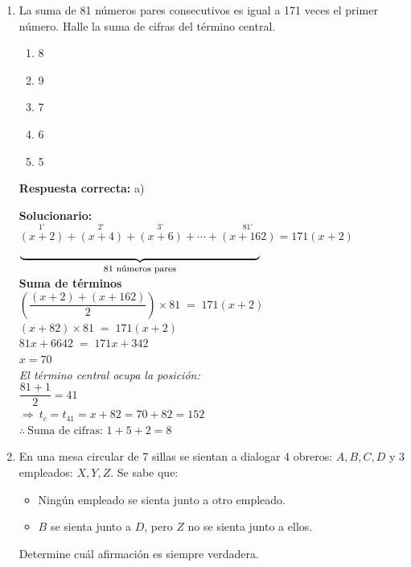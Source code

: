 \begin{enumerate}
\item La suma de 81 números pares consecutivos es igual a 171 veces el primer número. Halle la suma de cifras del término central.

\begin{enumerate}[label=\alph*)]
	\item 8
	\item 9
	\item 7
	\item 6
	\item 5
\end{enumerate}

\textbf{Respuesta correcta:} a)

\vspace{2mm}
\textbf{Solucionario:}\\[1mm]

$\overset{1^\circ}{(x+2)}+\overset{2^\circ}{(x+4)}+\overset{3^\circ}{(x+6)}+\cdots+\overset{81^\circ}{(x+162)}=171(x+2)$\\[-7mm]

\hspace{2mm}
$\underbrace{\hspace*{75mm}}_{\text{\footnotesize 81 números pares}}$\\[-2mm]

\vspace{2mm}
\hspace*{30mm}\textbf{Suma de términos}\\[1mm]
\hspace*{1mm}$\left(\dfrac{(x+2)+(x+162)}{2}\right)\times 81 \;=\;171(x+2)$\\


$(x+82)\times 81 \;=\;171(x+2)$\\
$81x+6642 \;=\;171x+342$\\
$x=70$\\[2mm]

\textit{El término central ocupa la posición:}\\[1mm]
$\dfrac{81+1}{2}=41$\\
$\Rightarrow\ t_c=t_{41}=x+82=70+82=152$\\[2mm]

$\therefore\ \text{Suma de cifras: }1+5+2=8$





\item En una mesa circular de 7 sillas se sientan a dialogar 4 obreros: $A,B,C,D$ y 3 empleados: $X,Y,Z$. Se sabe que:
\begin{itemize}
	\item Ningún empleado se sienta junto a otro empleado.
	\item $B$ se sienta junto a $D$, pero $Z$ no se sienta junto a ellos.
\end{itemize}
Determine cuál afirmación es siempre verdadera.


\end{enumerate}
